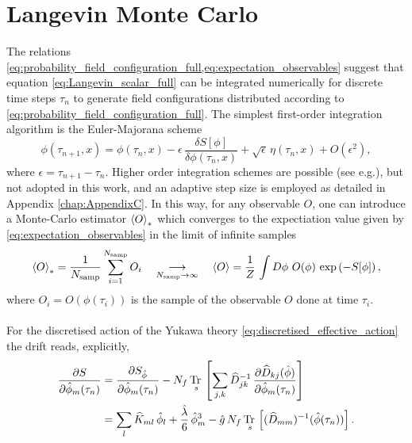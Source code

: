 \section{Langevin Monte Carlo}
\label{sec:langevin_monte_carlo}
The relations \eqref{eq:probability_field_configuration_full,eq:expectation_observables} suggest that equation \eqref{eq:Langevin_scalar_full} can be integrated numerically for discrete time steps $\tau_n$ to generate field configurations distributed according to \eqref{eq:probability_field_configuration_full}. 
The simplest first-order integration algorithm is the Euler-Majorana scheme \cite{ParisiWu}
\begin{equation*}
    \phi(\tau_{n+1}, x) = \phi(\tau_{n}, x) - \epsilon \,  \frac{\delta S[\phi]}{\delta \phi (\tau_n, x)} + \sqrt{\epsilon} \, \eta(\tau_n, x) + O(\epsilon^2),
\end{equation*}
where $\epsilon = \tau_{n+1} - \tau_n$. Higher order integration schemes are possible (see e.g.\cite{bilinearnoise1,Kronfeld1993}), but not adopted in this work, and an adaptive step size is employed as detailed in Appendix \ref{chap:AppendixC}.
In this way, for any observable $O$, one can introduce a Monte-Carlo estimator $\left\langle O \right\rangle_*$ which converges to the expectiation value given by \eqref{eq:expectation_observables} in the limit of infinite samples
\begin{equation}
    \expect{O}_{*} = \frac{1}{N_\text{samp}} \sum^{N_\text{samp}}_{i=1} O_i \quad \underset{N_\text{samp} \to \infty}{\longrightarrow} \quad \expect{O} = \frac{1}{Z} \, \int D\phi \ O(\phi) \, \exp\left(-S[\phi]\right),
    \label{eq:monte_carlo_estimator}
\end{equation}
where $O_i = O(\phi(\tau_i))$ is the sample of the observable $O$ done at time $\tau_i$. \\~\\
For the discretised action of the Yukawa theory \eqref{eq:discretised_effective_action} the drift reads, explicitly,
\begin{equation}
    \begin{aligned}
        \frac{\partial S}{\partial \hat{\phi}_m(\tau_n)} &= \frac{\partial S_{\hat{\phi}}}{\partial \hat{\phi}_m(\tau_n)} - N_f \, \underset{s}{\operatorname{\text{Tr} \,}} \left[\sum_{j,k} \widehat{D}^{-1}_{jk}  \, \frac{\partial \widehat{D}_{kj}(\hat{\phi})}{\partial \hat{\phi}_m(\tau_n)}\right] \\
        &= \sum_l \widehat{K}_{ml} \, \hat\phi_l + \frac{\hat\lambda}{6} \, \hat\phi_m^3 - \hat g \, N_f \, \underset{s}{\operatorname{\text{Tr} \,}} \left[(\widehat{D}_{mm})^{-1}(\hat{\phi}(\tau_n))\right].
    \end{aligned}
    \label{eq:drift_continuum_full_theory}
\end{equation}
